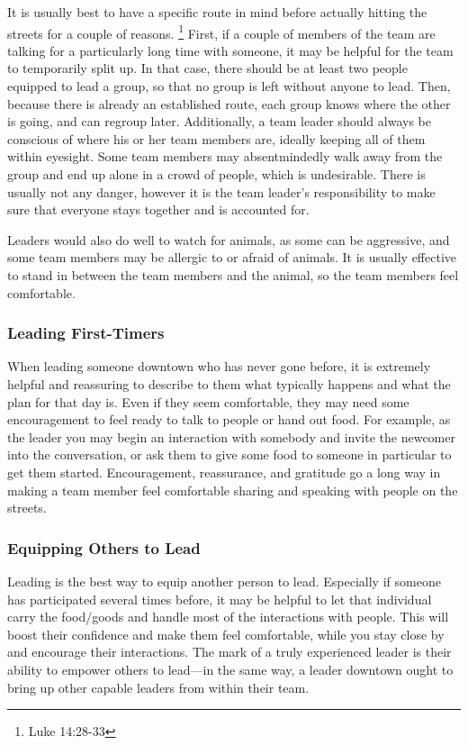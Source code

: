 \documentclass[12pt]{article}
\begin{document}
    \qLeaders
    It is usually best to have a specific route in mind before actually hitting the streets for a couple of reasons.
    \footnote{Luke 14:28-33}
    First, if a couple of members of the team are talking for a particularly long time with someone, it may be helpful for the team to temporarily split up.
    In that case, there should be at least two people equipped to lead a group, so that no group is left without anyone to lead.
    Then, because there is already an established route, each group knows where the other is going, and can regroup later.
    Additionally, a team leader should always be conscious of where his or her team members are, ideally keeping all of them within eyesight.
    Some team members may absentmindedly walk away from the group and end up alone in a crowd of people, which is undesirable.
    There is usually not any danger, however it is the team leader's responsibility to make sure that everyone stays together and is accounted for.
    \par Leaders would also do well to watch for animals, as some can be aggressive, and some team members may be allergic to or afraid of animals.
    It is usually effective to stand in between the team members and the animal, so the team members feel comfortable.

\subsubsection{Leading First-Timers}

    When leading someone downtown who has never gone before, it is extremely helpful and reassuring to describe to them what typically happens and what the plan for that day is.
    Even if they seem comfortable, they may need some encouragement to feel ready to talk to people or hand out food.
    For example, as the leader you may begin an interaction with somebody and invite the newcomer into the conversation, or ask them to give some food to someone in particular to get them started.
    Encouragement, reassurance, and gratitude go a long way in making a team member feel comfortable sharing and speaking with people on the streets.

\subsubsection{Equipping Others to Lead}

    Leading is the best way to equip another person to lead.
    Especially if someone has participated several times before, it may be helpful to let that individual carry the food/goods and handle most of the interactions with people.
    This will boost their confidence and make them feel comfortable, while you stay close by and encourage their interactions.
    The mark of a truly experienced leader is their ability to empower others to lead---in the same way, a leader downtown ought to bring up other capable leaders from within their team.
\end{document}
